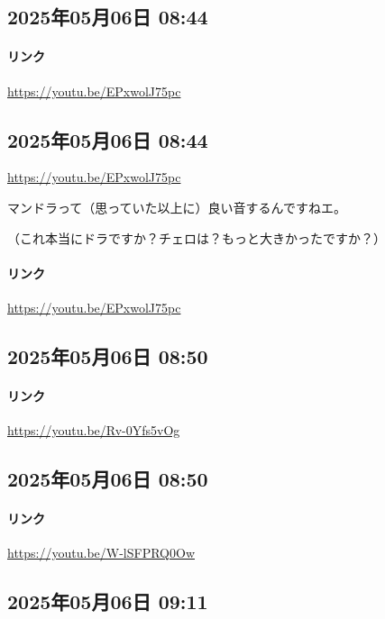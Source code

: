 \subsection*{2025年05月06日 08:44}

\paragraph{リンク}
\url{https://youtu.be/EPxwolJ75pc}

\subsection*{2025年05月06日 08:44}

\url{https://youtu.be/EPxwolJ75pc}

マンドラって（思っていた以上に）良い音するんですねエ。

（これ本当にドラですか？チェロは？もっと大きかったですか？）

\paragraph{リンク}
\url{https://youtu.be/EPxwolJ75pc}

\subsection*{2025年05月06日 08:50}

\paragraph{リンク}
\url{https://youtu.be/Rv-0Yfs5vOg}

\subsection*{2025年05月06日 08:50}

\paragraph{リンク}
\url{https://youtu.be/W-lSFPRQ0Ow}

\subsection*{2025年05月06日 09:11}

